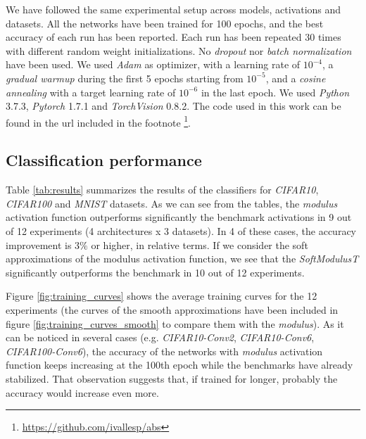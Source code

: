 \documentclass[authoryear]{elsarticle}
\begin{document}
We have followed the same experimental setup across models, activations and datasets. All the networks have been trained for 100 epochs, and the best accuracy of each run has been reported. Each run has been repeated 30 times with different random weight initializations. No \textit{dropout} \citep{Srivastava2014} nor \textit{batch normalization} \citep{Ioffe2015} have been used. We used \textit{Adam} \citep{Kingma14} as optimizer, with a learning rate of $10^{-4}$, a \textit{gradual warmup} \citep{gotmare2018} during the first 5 epochs starting from $10^{-5}$, and a \textit{cosine annealing} \citep{loshchilov2017} with a target learning rate of $10^{-6}$ in the last epoch. We used \textit{Python} 3.7.3, \textit{Pytorch} 1.7.1 and  \textit{TorchVision} 0.8.2. The code used in this work can be found in the url included in the footnote \footnote{\url{https://github.com/ivallesp/abs}}. 


\subsection{Classification performance}
Table \ref{tab:results} summarizes the results of the classifiers for \textit{CIFAR10}, \textit{CIFAR100} and \textit{MNIST} datasets. As we can see from the tables, the \textit{modulus} activation function outperforms significantly the benchmark activations in 9 out of 12 experiments (4 architectures x 3 datasets). In 4 of these cases, the accuracy improvement is $3\%$ or higher, in relative terms. If we consider the soft approximations of the modulus activation function, we see that the \textit{SoftModulusT} significantly outperforms the benchmark in 10 out of 12 experiments.

Figure \ref{fig:training_curves} shows the average training curves for the 12 experiments (the curves of the smooth approximations have been included in figure \ref{fig:training_curves_smooth} to compare them with the \textit{modulus}). As it can be noticed in several cases (e.g. \textit{CIFAR10-Conv2}, \textit{CIFAR10-Conv6}, \textit{CIFAR100-Conv6}), the accuracy of the networks with \textit{modulus} activation function keeps increasing at the 100th epoch while the benchmarks have already stabilized. That observation suggests that, if trained for longer, probably the accuracy would increase even more. 
\end{document}

